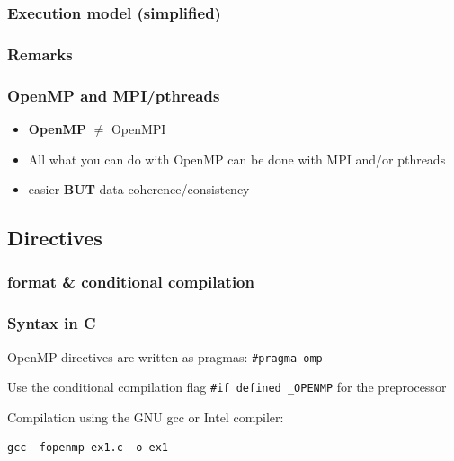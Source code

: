 \begin{frame}
  \frametitle{Execution model (simplified)}
  \begin{center}
    {}
  \end{center}
\end{frame}

\subsubsection{Remarks}

\begin{frame}
  \frametitle{OpenMP and MPI/pthreads	}
  \begin{itemize}
  \item{\textbf{OpenMP} $\neq$ OpenMPI}
  \item{All what you can do with OpenMP can be done with MPI and/or pthreads}
  \item{easier \textbf{BUT} data coherence/consistency}
  \end{itemize}
\end{frame}

\subsection{Directives}

\subsubsection{format \& conditional compilation}

\begin{frame}[containsverbatim]
  \frametitle{Syntax in C}

  \begin{block}{}
    OpenMP directives are written as pragmas: \texttt{\#pragma omp}
  \end{block}

  \begin{block}{}
    Use the conditional compilation flag \texttt{\#if defined \_OPENMP} for the preprocessor
  \end{block}

  Compilation using the GNU gcc or Intel compiler:
\begin{verbatim}
gcc -fopenmp ex1.c -o ex1
\end{verbatim}
\end{frame}


